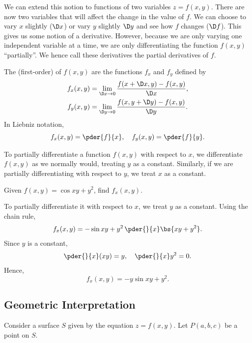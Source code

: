 We can extend this notion to functions of two variables $z = f(x, y)$. There are now two variables that will affect the change in the value of $f$. We can choose to vary $x$ slightly ($\D x$) or vary $y$ slightly $\D y$ and see how $f$ changes ($\D f$). This gives us some notion of a derivative. However, because we are only varying one independent variable at a time, we are only differentiating the function $f(x,y)$ ``partially''. We hence call these derivatives the partial derivatives of $f$.

\begin{definition}
    The (first-order)  of $f(x, y)$ are the functions $f_x$ and $f_y$ defined by
    \begin{align*}
        f_x(x, y) &= \lim_{\D x \to 0} \frac{f(x + \D x, y) - f(x, y)}{\D x},\\
        f_y(x, y) &= \lim_{\D y \to 0} \frac{f(x, y + \D y) - f(x, y)}{\D y}.
    \end{align*}
    In Liebniz notation, \[f_x(x, y) = \pder{f}{x}, \quad f_y(x, y) = \pder{f}{y}.\]
\end{definition}

\begin{recipe}
    To partially differentiate a function $f(x, y)$ with respect to $x$, we differentiate $f(x, y)$ as we normally would, treating $y$ as a constant. Similarly, if we are partially differentiating with respect to $y$, we treat $x$ as a constant.
\end{recipe}

\begin{sample}
    Given $f(x, y) = \cos{xy + y^2}$, find $f_x(x, y)$.
\end{sample}
\begin{sampans}
    To partially differentiate it with respect to $x$, we treat $y$ as a constant. Using the chain rule, \[f_x (x, y) = -\sin{xy + y^2} \, \pder{}{x} \bs{xy + y^2}.\] Since $y$ is a constant, \[\pder{}{x} (xy) = y, \quad \pder{}{x} y^2 = 0.\] Hence, \[f_x (x, y) = -y\sin{xy + y^2}.\]
\end{sampans}

\subsection{Geometric Interpretation}\label{subsec:Partial-Derivative-Geometric}

Consider a surface $S$ given by the equation $z = f(x, y)$. Let $P(a, b, c)$ be a point on $S$.

